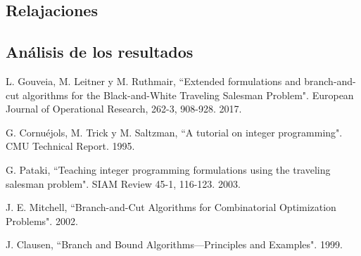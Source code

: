 \documentclass[10pt, a4paper]{article}
\theoremstyle{definition}
\begin{document}
\subsection{Relajaciones}

\subsection{Análisis de los resultados}

\pagebreak

\begin{thebibliography}{9}

L. Gouveia, M. Leitner y M. Ruthmair, “Extended formulations and branch-and-cut algorithms for the Black-and-White Traveling Salesman Problem". European Journal of Operational Research, 262-3, 908-928. 2017.

G. Cornuéjols, M. Trick y M. Saltzman, “A tutorial on integer programming". CMU Technical Report. 1995.

G. Pataki, “Teaching integer programming formulations using the traveling salesman problem". SIAM Review 45-1, 116-123. 2003.

J. E. Mitchell, “Branch-and-Cut Algorithms for Combinatorial Optimization Problems". 2002.

J. Clausen, “Branch and Bound Algorithms—Principles and Examples". 1999.

\end{thebibliography}
\end{document}
